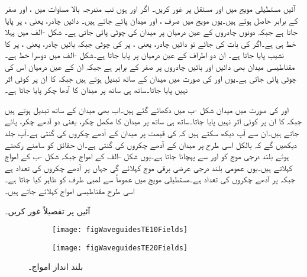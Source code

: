 آئیں مستطیلی مویج میں   اور  مستقل پر غور کریں۔ اگر  اور  ہوں تب مندرجہ بالا مساوات میں ،  اور  صفر کے برابر حاصل ہوتے ہیں۔یوں مویج میں صرف ،  اور  میدان پائے جاتے ہیں۔ دائیں چادر، یعنی ، پر  پایا جاتا ہے جبکہ دونوں چادروں کے عین درمیان  پر میدان کی چوٹی پائی جاتی ہے۔ شکل -الف میں پہلا خط  ہی ہے۔اگر  کی بات کی جائے تو دائیں چادر، یعنی ، پر  کی چوٹی جبکہ بائیں چادر، یعنی ، پر  کا نشیب پایا جاتا ہے۔ ان دو اطراف کے عین درمیان  پر  پایا جاتا ہے۔شکل -الف میں دوسرا خط  ہے۔مقناطیسی میدان  بھی دائیں اور بائیں چادروں پر صفر کے برابر ہے جبکہ ان کے عین درمیان اس کی چوٹی پائی جاتی ہے۔یوں  اور  کی صورت میں میدان  کے ساتھ تبدیل ہوتے ہیں جبکہ  کا ان پر کوئی اثر نہیں پایا جاتا۔ساتھ ہی ساتھ  پر میدان کا آدھا چکر پایا جاتا ہے۔ 

 اور  کی صورت میں میدان شکل -ب  میں دکھائے گئے ہیں۔اب بھی میدان  کے ساتھ تبدیل ہوتے ہیں جبکہ  کا ان پر کوئی اثر نہیں پایا جاتا۔ساتھ ہی ساتھ  پر میدان کا مکمل چکر، یعنی دو آدھے چکر، پائے جاتے ہیں۔ان سے آپ دیکھ سکتے ہیں کہ  کی قیمت  پر میدان کے آدھے چکروں کی گنتی ہے۔آپ جلد دیکھیں گے کہ  بالکل اسی طرح  پر میدان کے آدھے چکروں کی گنتی ہے۔ان حقائق کو سامنے رکھتے ہوئے بلند درجی  موج کو  اور  سے پہچانا جاتا ہے۔یوں شکل -الف کے امواج   جبکہ شکل -ب کے امواج  کہلاتے ہیں۔یوں عمومی بلند درجی عرضی برقی موج  کہلائے گی جہاں  پر آدھے چکروں کی تعداد  ہے جبکہ  پر آدھے چکروں کی تعداد  ہے۔مستطیلی مویج میں عموماً  سے لمبی طرف کو ظاہر کیا جاتا ہے۔اسی طرح مقناطیسی امواج  کہلائے جاتے ہیں۔

آئیں  پر تفصیلاً غور کریں۔


\begin{figure}
\centering
\begin{subfigure}{0.4\textwidth}
\texttt{[image: figWaveguidesTE10Fields]}
\end{subfigure}%
%
\begin{subfigure}{0.4\textwidth}
\texttt{[image: figWaveguidesTE20Fields]}
\end{subfigure}%
\caption{بلند  انداز  امواج۔}
\label{شکل_مویج_بلند_ایک_صفر_دو_صفر}
\end{figure}

